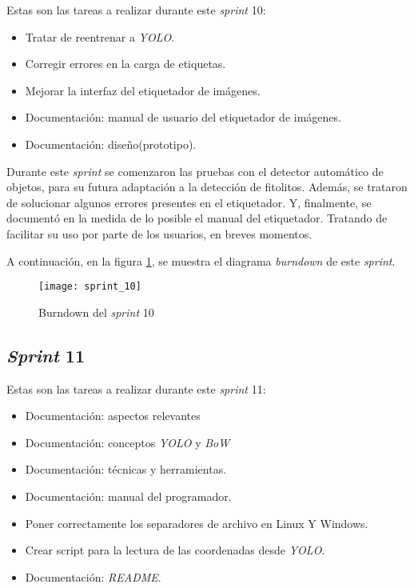 Estas son las tareas a realizar durante este \textit{sprint} 10:

\begin{itemize}
	\item Tratar de reentrenar a \textit{YOLO}.
	\item Corregir errores en la carga de etiquetas.
	\item Mejorar la interfaz del etiquetador de imágenes.
	\item Documentación: manual de usuario del etiquetador de imágenes.
	\item Documentación: diseño(prototipo).
\end{itemize}

Durante este \textit{sprint} se comenzaron las pruebas con el detector automático de objetos, para su futura adaptación a la detección de fitolitos. Además, se trataron de solucionar algunos errores presentes en el etiquetador. Y, finalmente, se documentó en la medida de lo posible el manual del etiquetador. Tratando de facilitar su uso por parte de los usuarios, en breves momentos.

A continuación, en la figura \ref{fig:A.1.11}, se muestra el diagrama \textit{burndown} de este \textit{sprint}.

\begin{figure}
\centering
\texttt{[image: sprint\_10]}
\caption{Burndown del \textit{sprint} 10}
\label{fig:A.1.11}
\end{figure}

\subsection{\textit{Sprint} 11}

Estas son las tareas a realizar durante este \textit{sprint} 11:

\begin{itemize}
	\item Documentación: aspectos relevantes
	\item Documentación: conceptos \textit{YOLO} y \textit{BoW}
	\item Documentación: técnicas y herramientas.
	\item Documentación: manual del programador.
	\item Poner correctamente los separadores de archivo en Linux Y Windows.
	\item Crear script para la lectura de las coordenadas desde \textit{YOLO}.
	\item Documentación: \textit{README}.
\end{itemize}

